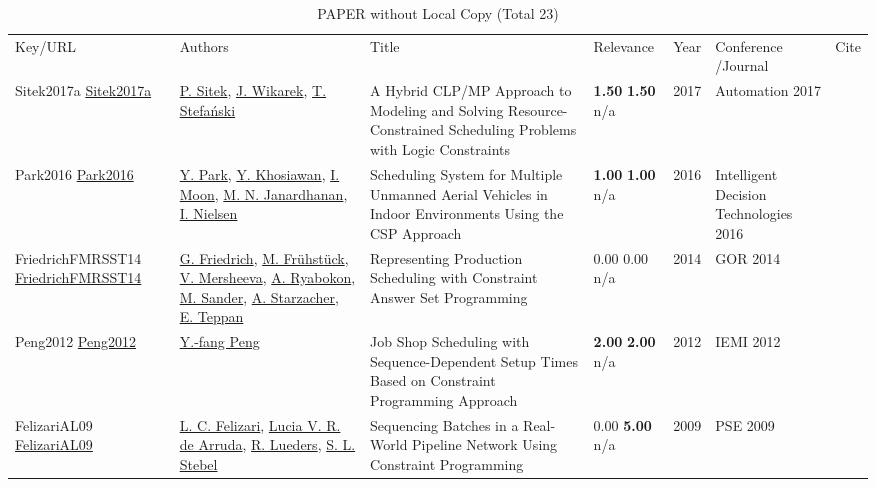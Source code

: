 {\scriptsize
\begin{longtable}{p{3cm}p{5cm}p{10cm}p{1cm}rp{2.5cm}l}
\rowcolor{white}\caption{PAPER without Local Copy (Total 23)}\\ \toprule
\rowcolor{white}Key/URL & Authors & Title & Relevance &Year & \shortstack{Conference\\/Journal} & Cite\\ \midrule
\endhead
\bottomrule
\endfoot
Sitek2017a \href{http://dx.doi.org/10.1007/978-3-319-54042-9_12}{Sitek2017a} & \hyperref[auth:a1474]{P. Sitek}, \hyperref[auth:a534]{J. Wikarek}, \hyperref[auth:a1607]{T. Stefański} & A Hybrid CLP/MP Approach to Modeling and Solving Resource-Constrained Scheduling Problems with Logic Constraints & \noindent{}\textbf{1.50} \textbf{1.50} n/a & 2017 & Automation 2017 & \cite{Sitek2017a}\\
Park2016 \href{http://dx.doi.org/10.1007/978-3-319-39630-9_7}{Park2016} & \hyperref[auth:a1699]{Y. Park}, \hyperref[auth:a1700]{Y. Khosiawan}, \hyperref[auth:a1701]{I. Moon}, \hyperref[auth:a1702]{M. N. Janardhanan}, \hyperref[auth:a1703]{I. Nielsen} & Scheduling System for Multiple Unmanned Aerial Vehicles in Indoor Environments Using the CSP Approach & \noindent{}\textbf{1.00} \textbf{1.00} n/a & 2016 & Intelligent Decision Technologies 2016 & \cite{Park2016}\\
FriedrichFMRSST14 \href{https://doi.org/10.1007/978-3-319-28697-6_23}{FriedrichFMRSST14} & \hyperref[auth:a601]{G. Friedrich}, \hyperref[auth:a602]{M. Fr{\"{u}}hst{\"{u}}ck}, \hyperref[auth:a603]{V. Mersheeva}, \hyperref[auth:a604]{A. Ryabokon}, \hyperref[auth:a605]{M. Sander}, \hyperref[auth:a606]{A. Starzacher}, \hyperref[auth:a607]{E. Teppan} & Representing Production Scheduling with Constraint Answer Set Programming & \noindent{}\textcolor{black!50}{0.00} \textcolor{black!50}{0.00} n/a & 2014 & GOR 2014 & \cite{FriedrichFMRSST14}\\
Peng2012 \href{http://dx.doi.org/10.1007/978-3-642-33012-4_83}{Peng2012} & \hyperref[auth:a1608]{Y.-fang Peng} & Job Shop Scheduling with Sequence-Dependent Setup Times Based on Constraint Programming Approach & \noindent{}\textbf{2.00} \textbf{2.00} n/a & 2012 & IEMI 2012 & \cite{Peng2012}\\
FelizariAL09 \href{https://www.sciencedirect.com/science/article/pii/S1570794605800136}{FelizariAL09} & \hyperref[auth:a1461]{L. C. Felizari}, \hyperref[auth:a1462]{Lucia V. R. de Arruda}, \hyperref[auth:a1463]{R. Lueders}, \hyperref[auth:a1464]{S. L. Stebel} & Sequencing Batches in a Real-World Pipeline Network Using Constraint Programming & \noindent{}\textcolor{black!50}{0.00} \textbf{5.00} n/a & 2009 & PSE 2009 & \cite{FelizariAL09}\\

\end{longtable}}
